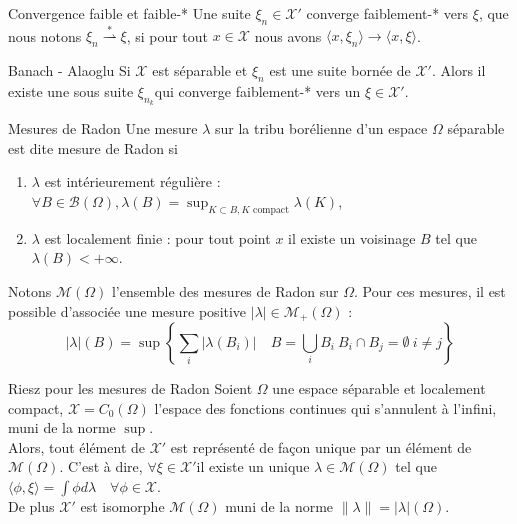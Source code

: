 \documentclass[a4paper,12pt]{article}
\begin{document}
\begin{appendices}
\begin{definition}{Convergence faible et faible-*}
Une suite $\xi_n\in\mathcal{X}'$ converge faiblement-* vers $\xi$, que nous notons $\xi_n \overset{\ast}{\rightharpoonup}\xi$, si pour tout $x\in \mathcal{X}$ nous avons $\langle
x,\xi_n\rangle\rightarrow\langle x,\xi\rangle$.

\end{definition}

\begin{theoreme}{Banach - Alaoglu}
Si $\mathcal{X}$ est séparable et $\xi_n$ est une suite bornée de $\mathcal{X}'$. Alors il existe une sous suite $\xi_{n_k}$qui converge faiblement-* vers un $\xi\in\mathcal{X}'$.  
\end{theoreme}

\begin{definition}{Mesures de Radon}
Une mesure $\lambda$ sur la tribu borélienne d'un espace $\Omega$ séparable est dite mesure de Radon si 
\begin{enumerate}
\item $\lambda$ est intérieurement régulière : $\forall B\in\mathcal{B}(\Omega), \lambda (B) = \sup_{K\subset B, K \text{ compact}} \lambda (K)$,
\item $\lambda$ est localement finie : pour tout point $x$ il existe un voisinage $B$ tel que $\lambda (B) < +\infty$. 
\end{enumerate}
Notons $\mathcal{M}(\Omega)$ l'ensemble des mesures de Radon sur $\Omega$. Pour ces mesures, il est possible d'associée une mesure positive $|\lambda |\in \mathcal{M}_+(\Omega)$ : 
$$
|\lambda |(B) = \sup \left\{ \sum_i |\lambda (B_i)| \quad B = \bigcup_i B_i \ B_i\cap B_j = \emptyset \ i\neq j \right\}
$$
\end{definition}

\begin{theoreme}{Riesz pour les mesures de Radon}
Soient $\Omega$ une espace séparable et localement compact, $\mathcal{X} = C_0(\Omega)$ l'espace des fonctions continues qui s'annulent à l'infini, muni de la norme $\sup$. \\
Alors, tout élément de $\mathcal{X}'$ est représenté de façon unique par un élément de $\mathcal{M}(\Omega)$. C'est à dire, $\forall \xi\in\mathcal{X}'$il existe un unique $\lambda\in\mathcal{M}(\Omega)$ tel que $\langle \phi,\xi \rangle =\int \phi d\lambda\quad\forall\phi\in\mathcal{X}$. \\
De plus $\mathcal{X}'$ est isomorphe $\mathcal{M}(\Omega)$ muni de la norme $\|\lambda\|=|\lambda|(\Omega)$. 
\end{theoreme}


\end{appendices}
\end{document}
